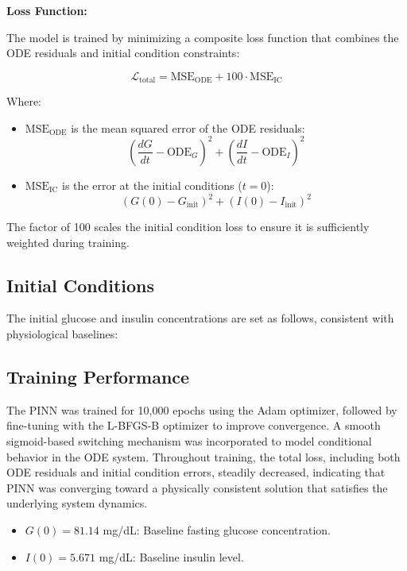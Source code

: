 \documentclass[conference]{IEEEtran}
\begin{document}
\textbf{Loss Function:}

The model is trained by minimizing a composite loss function that combines the ODE residuals and initial condition constraints:

\[
\mathcal{L}_{\text{total}} = \text{MSE}_{\text{ODE}} + 100 \cdot \text{MSE}_{\text{IC}}
\]

Where:
\begin{itemize}
    \item $\text{MSE}_{\text{ODE}}$ is the mean squared error of the ODE residuals:
    \[
    \left( \frac{dG}{dt} - \text{ODE}_G \right)^2 + \left( \frac{dI}{dt} - \text{ODE}_I \right)^2
    \]
    
    \item $\text{MSE}_{\text{IC}}$ is the error at the initial conditions ($t = 0$):
    \[
    (G(0) - G_{\text{init}})^2 + (I(0) - I_{\text{init}})^2
    \]
\end{itemize}
The factor of 100 scales the initial condition loss to ensure it is sufficiently weighted during training.
\subsection*{Initial Conditions}
The initial glucose and insulin concentrations are set as follows, consistent with physiological baselines:
\subsection*{Training Performance}

The PINN was trained for 10,000 epochs using the Adam optimizer, followed by fine-tuning with the L-BFGS-B optimizer to improve convergence. A smooth sigmoid-based switching mechanism was incorporated to model conditional behavior in the ODE system. Throughout training, the total loss, including both ODE residuals and initial condition errors, steadily decreased, indicating that PINN was converging toward a physically consistent solution that satisfies the underlying system dynamics.

\vspace{0.1cm}
\begin{itemize}
    \item $G(0) = 81.14$ mg/dL: Baseline fasting glucose concentration.
    \item $I(0) = 5.671$ mg/dL: Baseline insulin level.
\end{itemize}

\vspace{0.3cm}
\end{document}
